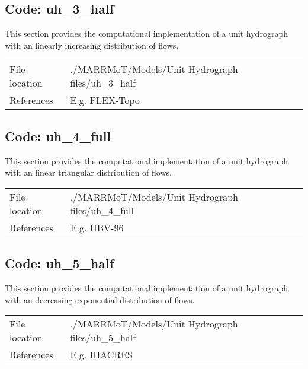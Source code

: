 \subsection{Code: uh\_3\_half} \label{sec:sm3_3}
This section provides the computational implementation of a unit hydrograph with an linearly increasing distribution of flows. \\

\begin{tabular}{ll}
	File location & 	./MARRMoT/Models/Unit Hydrograph files/uh\_3\_half \\
	References & 	E.g. FLEX-Topo \citep{Savenije2010}
\end{tabular}

\bigskip


\subsection{Code: uh\_4\_full} \label{sec:sm3_4}
This section provides the computational implementation of a unit hydrograph with an linear triangular distribution of flows. \\

\begin{tabular}{ll}
	File location & 	./MARRMoT/Models/Unit Hydrograph files/uh\_4\_full \\
	References & 	E.g. HBV-96 \citep{Lindstrom1997} \\
\end{tabular}

\bigskip


\subsection{Code: uh\_5\_half} \label{sec:sm3_5}
This section provides the computational implementation of a unit hydrograph with an decreasing exponential distribution of flows. \\

\begin{tabular}{ll}
	File location & 	./MARRMoT/Models/Unit Hydrograph files/uh\_5\_half \\
	References & 	E.g. IHACRES \citep{Littlewood1997,Croke2004} \\
\end{tabular}

